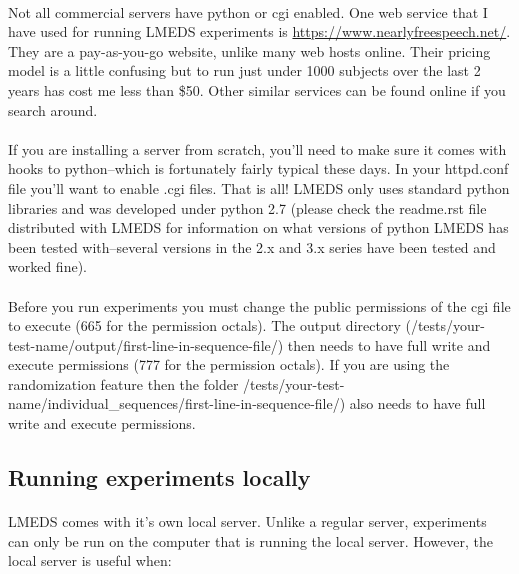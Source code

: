 \paragraph{}
Not all commercial servers have python or cgi enabled.  One web service that I have used for running LMEDS experiments is \url{https://www.nearlyfreespeech.net/}.  They are a pay-as-you-go website, unlike many web hosts online.  Their pricing model is a little confusing but to run just under 1000 subjects over the last 2 years has cost me less than \$50.  Other similar services can be found online if you search around.

\paragraph{}
If you are installing a server from scratch, you'll need to make sure it comes with hooks to python--which is fortunately fairly typical these days.  In your httpd.conf file you'll want to enable .cgi files.  That is all!  LMEDS only uses standard python libraries and was developed under python 2.7 (please check the readme.rst file distributed with LMEDS for information on what versions of python LMEDS has been tested with--several versions in the 2.x and 3.x series have been tested and worked fine).

\paragraph{}
\begin{tcolorbox}[breakable,colback=white,colframe=green,width=\dimexpr\textwidth+12mm\relax,enlarge left by=-6mm,enlarge right by=6mm]
Before you run experiments you must change the public permissions of the cgi file to execute (665 for the permission octals).  The output directory (/tests/your-test-name/output/first-line-in-sequence-file/) then needs to have full write and execute permissions (777 for the permission octals).  If you are using the randomization feature then the folder /tests/your-test-name/individual\_sequences/first-line-in-sequence-file/) also needs to have full write and execute permissions.
\end{tcolorbox}

\subsection{Running experiments locally} 

\paragraph{}
LMEDS comes with it's own local server.  Unlike a regular server, experiments can only be run on the computer that is running the local server.  However, the local server is useful when:


